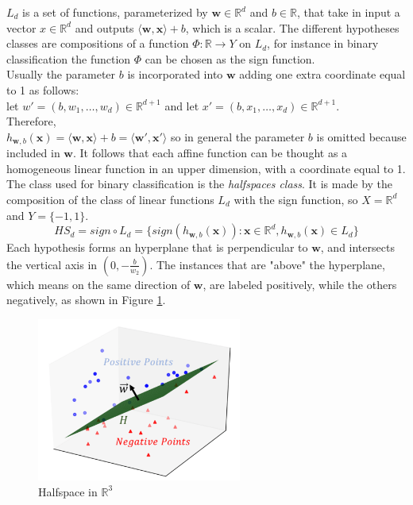 $L_d$ is a set of functions, parameterized by $\mathbf{w} \in \mathbb{R}^d$ and $b \in \mathbb{R}$, that take in input a vector $x \in \mathbb{R}^d$ and outputs $\langle \textbf{w},\textbf{x} \rangle + b$, which is a scalar.
The different hypotheses classes are compositions of a function $\Phi : \mathbb{R} \rightarrow Y$ on $L_d$, for instance in binary classification the function $\Phi$ can be chosen as the sign function.\\
Usually the parameter $b$ is incorporated into $\mathbf{w}$ adding one extra coordinate equal to 1 as follows:\\
let $w'=(b, w_1, \dots , w_d) \in \mathbb{R}^{d+1}$ and let $x'=(b, x_1, \dots , x_d) \in \mathbb{R}^{d+1}$.\\
Therefore, \\
$h_{\mathbf{w},b}(\mathbf{x}) = \langle \mathbf{w},\mathbf{x} \rangle + b = \langle \mathbf{w'},\mathbf{x'} \rangle$
so in general the parameter $b$ is omitted because included in $\mathbf{w}$. It follows that each affine function can be thought as a homogeneous linear function in an upper dimension, with a coordinate equal to 1.\\
The class used for binary classification is the \textit{halfspaces class}. It is made by the composition of the class of linear functions $L_d$ with the sign function, so $X=\mathbb{R}^d$ and $Y=\{-1,1\}$.
\[ HS_d = sign \circ L_d = \{ sign( h_{\mathbf{w},b}(\mathbf{x}) ) : \mathbf{x} \in \mathbb{R}^d, h_{\mathbf{w},b}(\mathbf{x}) \in L_d \} \]
Each hypothesis forms an hyperplane that is perpendicular to $\mathbf{w}$, and intersects the vertical axis in $(0, -\frac{b}{w_2})$. The instances that are "above" the hyperplane, which means on the same direction of $\mathbf{w}$, are labeled positively, while the others negatively, as shown in Figure \ref{fig:halfspace}.

\begin{figure}[ht]
	\centering
	\includegraphics[width=0.6\textwidth]{figures/halfspace.png}
	\caption{Halfspace in $\mathbb{R}^3$}
	\label{fig:halfspace}
\end{figure}











